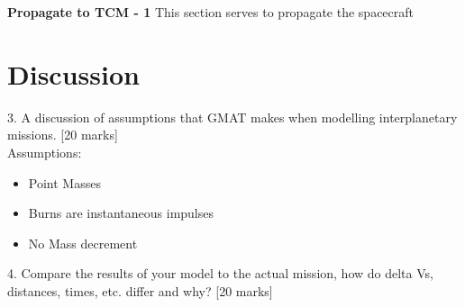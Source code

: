 \documentclass[11pt]{article}
\begin{document}
\textbf{Propagate to TCM - 1} This section serves to propagate the spacecraft 


\section{Discussion}
3. A discussion of assumptions that GMAT makes when modelling interplanetary missions.
[20 marks]\\

Assumptions:
\begin{itemize}
    \item Point Masses
    \item Burns are instantaneous impulses
    \item No Mass decrement
\end{itemize}





4. Compare the results of your model to the actual mission, how do delta Vs, distances,
times, etc. differ and why?
[20 marks]







\appendix
\renewcommand\thefigure{A.\arabic{figure}}  
\setcounter{figure}{0}
\end{document}
